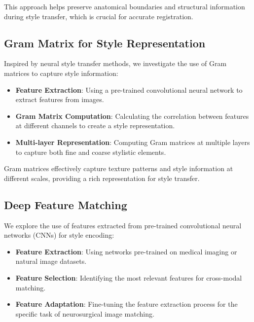 This approach helps preserve anatomical boundaries and structural information during style transfer, which is crucial for accurate registration.

\subsection{Gram Matrix for Style Representation}

Inspired by neural style transfer methods, we investigate the use of Gram matrices to capture style information:

\begin{itemize}
    \item \textbf{Feature Extraction}: Using a pre-trained convolutional neural network to extract features from images.
    
    \item \textbf{Gram Matrix Computation}: Calculating the correlation between features at different channels to create a style representation.
    
    \item \textbf{Multi-layer Representation}: Computing Gram matrices at multiple layers to capture both fine and coarse stylistic elements.
\end{itemize}

Gram matrices effectively capture texture patterns and style information at different scales, providing a rich representation for style transfer.

\subsection{Deep Feature Matching}

We explore the use of features extracted from pre-trained convolutional neural networks (CNNs) for style encoding:

\begin{itemize}
    \item \textbf{Feature Extraction}: Using networks pre-trained on medical imaging or natural image datasets.
    
    \item \textbf{Feature Selection}: Identifying the most relevant features for cross-modal matching.
    
    \item \textbf{Feature Adaptation}: Fine-tuning the feature extraction process for the specific task of neurosurgical image matching.
\end{itemize}

